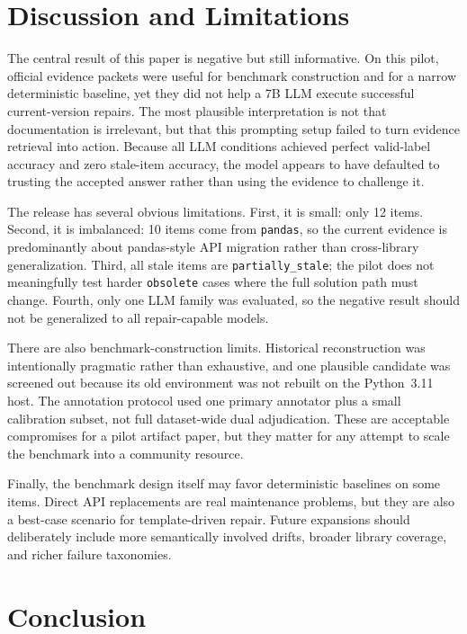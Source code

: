 \documentclass{article}
\begin{document}
\section{Discussion and Limitations}
\label{sec:discussion}

The central result of this paper is negative but still informative. On this pilot, official evidence packets were useful for benchmark construction and for a narrow deterministic baseline, yet they did not help a 7B LLM execute successful current-version repairs. The most plausible interpretation is not that documentation is irrelevant, but that this prompting setup failed to turn evidence retrieval into action. Because all LLM conditions achieved perfect valid-label accuracy and zero stale-item accuracy, the model appears to have defaulted to trusting the accepted answer rather than using the evidence to challenge it.

The release has several obvious limitations. First, it is small: only 12 items. Second, it is imbalanced: 10 items come from \texttt{pandas}, so the current evidence is predominantly about pandas-style API migration rather than cross-library generalization. Third, all stale items are \texttt{partially\_stale}; the pilot does not meaningfully test harder \texttt{obsolete} cases where the full solution path must change. Fourth, only one LLM family was evaluated, so the negative result should not be generalized to all repair-capable models.

There are also benchmark-construction limits. Historical reconstruction was intentionally pragmatic rather than exhaustive, and one plausible candidate was screened out because its old environment was not rebuilt on the Python~3.11 host. The annotation protocol used one primary annotator plus a small calibration subset, not full dataset-wide dual adjudication. These are acceptable compromises for a pilot artifact paper, but they matter for any attempt to scale the benchmark into a community resource.

Finally, the benchmark design itself may favor deterministic baselines on some items. Direct API replacements are real maintenance problems, but they are also a best-case scenario for template-driven repair. Future expansions should deliberately include more semantically involved drifts, broader library coverage, and richer failure taxonomies.

\section{Conclusion}
\end{document}
